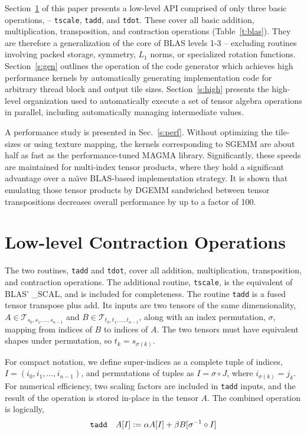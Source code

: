 \documentclass[preprint]{sigplanconf}
\begin{document}
  Section~\ref{s:low} of this paper presents a low-level API comprised of only three basic operations,
-- {\tt tscale}, {\tt tadd}, and {\tt tdot}.  These  cover all basic addition, multiplication, transposition,
and contraction operations (Table~\ref{t:blas}).
They are therefore a generalization of the core of BLAS levels 1-3
-- excluding routines involving packed storage, symmetry, $L_1$ norms, or specialized rotation functions.
Section~\ref{s:gen} outlines the operation of the code generator which
achieves high performance kernels by automatically generating implementation code for
arbitrary thread block and output tile sizes.
Section~\ref{s:high} presents the high-level organization used to automatically execute a
set of tensor algebra operations in parallel, including automatically
managing intermediate values.

  A performance study is presented in Sec.~\ref{s:perf}.  Without optimizing the tile-sizes
or using texture mapping, the kernels corresponding to SGEMM are about half as fast
as the performance-tuned MAGMA library.  Significantly, these speeds are maintained
for multi-index tensor products, where they hold a significant advantage over a na\"{\i}ve
BLAS-based implementation strategy.
It is shown that emulating those tensor products by
DGEMM sandwiched between tensor transpositions decreases overall performance by up
to a factor of 100.%

\section{ Low-level Contraction Operations}\label{s:low}

  The two routines, {\tt tadd} and {\tt tdot}, cover all addition, multiplication, transposition,
and contraction operations.  The additional routine, {\tt tscale}, is the equivalent of BLAS' \_SCAL,
and is included for completeness.
The routine {\tt tadd} is a fused tensor transpose plus add.
Its inputs are two tensors of the same dimensionality, $A \in \mathcal T_{s_0,s_1,\ldots,s_{n-1}}$
and $B \in \mathcal T_{t_0,t_1,\ldots,t_{n-1}}$, along with an index permutation,
$\sigma$, mapping from indices of $B$ to indices of $A$.
The two tensors must have equivalent shapes under permutation, so $t_k = s_{\sigma(k)}$.

  For compact notation, we define super-indices as a complete tuple of indices,
$I = (i_0, i_1, \ldots, i_{n-1})$, and permutations of tuples as
$I = \sigma \circ J$, where $i_{\sigma(k)} = j_k$.
For numerical efficiency, two scaling factors are included in {\tt tadd}
inputs, and the result of the operation is stored in-place in the tensor $A$.
The combined operation is logically,
\begin{equation}
\text{\tt tadd} \quad A[I] := \alpha A[I] + \beta B[\sigma^{-1} \circ I]
\end{equation}
\end{document}
